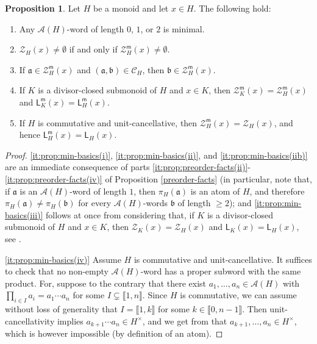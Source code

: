 \documentclass{report}
\newcommand{\A}{\mathcal{A}}
\newcommand{\Z}{\mathcal{Z}}
\newcommand{\llb}{\llbracket}
\newcommand{\rrb}{\rrbracket}
\newcommand{\m}{{\mathsf{m}}}
\renewcommand{\:}{\text{:}}
\theoremstyle{definition}
\newtheorem{prop}[defn]{Proposition}
\begin{document}
\begin{prop}\label{prop:min-basics}
	Let $H$ be a monoid and let $x\in H$. The following hold:
	\begin{enumerate}[label = {\rm (\roman{*})}]
		\item\label{it:prop:min-basics(i)} Any $\A(H)$-word of length $0$, $1$, or $2$ is minimal.
		\item\label{it:prop:min-basics(ii)} $\Z_H(x) \ne \emptyset$ if and only if  $\Z_H^\m(x) \ne \emptyset$.
		\item\label{it:prop:min-basics(iib)} If $\mathfrak a \in \mathcal Z_H^\m(x)$ and $(\mathfrak a, \mathfrak b) \in \mathscr C_H$, then $\mathfrak b \in \mathcal Z_H^\m(x)$.
		\item\label{it:prop:min-basics(iii)} If $K$ is a divisor-closed submonoid of $H$ and $x \in K$, then $\Z_K^\m(x) = \Z_H^\m(x)$ and $\mathsf L_K^\m(x) = \mathsf L_H^\m(x)$.
		\item\label{it:prop:min-basics(iv)} If $H$ is commutative and unit-cancellative, then $\Z_H^\m(x) = \Z_H(x)$, and hence $\mathsf L_H^\m(x) = \mathsf L_H(x)$.
	\end{enumerate}
\end{prop}
%
\begin{proof}
	\ref{it:prop:min-basics(i)}, \ref{it:prop:min-basics(ii)}, and \ref{it:prop:min-basics(iib)} are an immediate consequence of parts \ref{it:prop:preorder-facts(ii)}-\ref{it:prop:preorder-facts(iv)} of Proposition \ref{preorder-facts} (in particular, note that, if $\mathfrak a$  is an $\mathscr A(H)$-word of length $1$, then $\pi_H(\mathfrak a)$ is an atom of $H$, and therefore $\pi_H(\mathfrak a) \ne \pi_H(\mathfrak b)$ for every  $\mathscr A(H)$-words $\mathfrak b$ of length $\ge 2$); and \ref{it:prop:min-basics(iii)} follows at once from considering that, if $K$ is a divisor-closed submonoid of $H$ and $x \in K$, then $\mathcal Z_K(x) = \mathcal Z_H(x)$ and $\mathsf L_K(x) = \mathsf L_H(x)$, see \cite[Proposition 2.21(ii)]{fan-tringali18}.
	
	\ref{it:prop:min-basics(iv)} Assume $H$ is commutative and unit-cancellative. It suffices to check that no non-empty $\mathscr A(H)$-word has a proper subword with the same product.
	For, suppose to the contrary that there exist  $a_1,\dots,a_n \in \mathscr A(H)$ with $\prod_{i \in I} a_i = a_1\cdots a_n$ for some $I \subsetneq \llb 1, n \rrb$. Since $H$ is commutative, we can assume without loss of generality that $I = \llb 1, k \rrb$ for some $k \in \llb 0, n-1 \rrb$. Then unit-cancellativity implies $a_{k+1}\cdots a_n \in H^\times$, and we get from \cite[Proposition 2.30]{fan-tringali18} that $a_{k+1},\dots,a_n \in H^\times$, which is however impossible (by definition of an atom).	
\end{proof}
\end{document}
